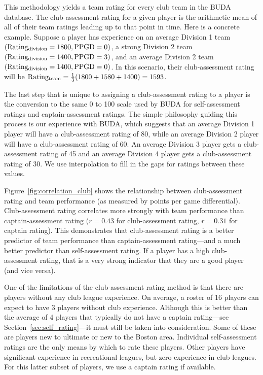 This methodology yields a team rating for every club team in the BUDA database. The club-assessment rating for a given player is the arithmetic mean of all of their team ratings leading up to that point in time. Here is a concrete example. Suppose a player has experience on an average Division 1 team $({\rm Rating_{division} = 1800}, {\rm PPGD} = 0)$, a strong Division 2 team $({\rm Rating_{division} = 1400}, {\rm PPGD} = 3)$, and an average Division 2 team $({\rm Rating_{division} = 1400}, {\rm PPGD} = 0)$. In this scenario, their club-assessment rating will be ${\rm Rating_{team}} = \frac{1}{3}(1800 + 1580 + 1400) = 1593$.

The last step that is unique to assigning a club-assessment rating to a player is the conversion to the same 0 to 100 scale used by BUDA for self-assessment ratings and captain-assessment ratings. The simple philosophy guiding this process is our experience with BUDA, which suggests that an average Division 1 player will have a club-assessment rating of 80, while an average Division 2 player will have a club-assessment rating of 60. An average Division 3 player gets a club-assessment rating of 45 and an average Division 4 player gets a club-assessment rating of 30. We use interpolation to fill in the gaps for ratings between these values.

Figure~\ref{fig:correlation_club} shows the relationship between club-assessment rating and team performance (as measured by points per game differential). Club-assessment rating correlates more strongly with team performance than captain-assessment rating ($r = 0.43$ for club-assessment rating, $r = 0.31$ for captain rating). This demonstrates that club-assessment rating is a better predictor of team performance than captain-assessment rating---and a much better predictor than self-assessment rating. If a player has a high club-assessment rating, that is a very strong indicator that they are a good player (and vice versa).

One of the limitations of the club-assessment rating method is that there are players without any club league experience.  On average, a roster of 16 players can expect to have 3 players without club experience. Although this is better than the average of 4 players that typically do not have a captain rating---see Section~\ref{sec:self_rating}---it must still be taken into consideration. Some of these are players new to ultimate or new to the Boston area. Individual self-assessment ratings are the only means by which to rate these players. Other players have significant experience in recreational leagues, but zero experience in club leagues. For this latter subset of players, we use a captain rating if available. 

